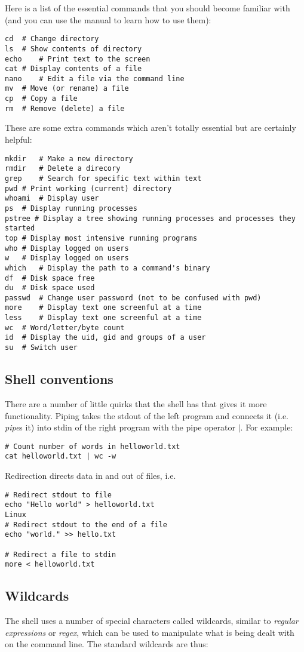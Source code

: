 \documentclass{article}
\begin{document}
Here is a list of the essential commands that you should become familiar with (and you can use the manual to learn how to use them): 
\begin{verbatim}
cd	# Change directory
ls	# Show contents of directory
echo	# Print text to the screen
cat	# Display contents of a file
nano	# Edit a file via the command line
mv	# Move (or rename) a file
cp	# Copy a file
rm	# Remove (delete) a file
\end{verbatim}
These are some extra commands which aren't totally essential but are certainly helpful:
\begin{verbatim}
mkdir	# Make a new directory
rmdir	# Delete a direcory
grep	# Search for specific text within text
pwd	# Print working (current) directory
whoami	# Display user
ps	# Display running processes
pstree # Display a tree showing running processes and processes they started
top # Display most intensive running programs
who	# Display logged on users
w	# Display logged on users
which	# Display the path to a command's binary
df	# Disk space free
du	# Disk space used
passwd	# Change user password (not to be confused with pwd)
more	# Display text one screenful at a time
less	# Display text one screenful at a time
wc	# Word/letter/byte count
id	# Display the uid, gid and groups of a user
su	# Switch user
\end{verbatim}

\subsection{Shell conventions}
There are a number of little quirks that the shell has that gives it more functionality.
Piping takes the stdout of the left program and connects it (i.e. \emph{pipe}s it) into stdin of the right program with the pipe operator $|$. For example:
\begin{verbatim}
# Count number of words in helloworld.txt
cat helloworld.txt | wc -w 
\end{verbatim}
Redirection directs data in and out of files, i.e. 
\begin{verbatim}
# Redirect stdout to file
echo "Hello world" > helloworld.txt
Linux
# Redirect stdout to the end of a file
echo "world." >> hello.txt

# Redirect a file to stdin
more < helloworld.txt
\end{verbatim}

\subsection{Wildcards}
The shell uses a number of special characters called wildcards, similar to \emph{regular expressions} or \emph{regex}, which can be used to manipulate what is being dealt with on the command line. The standard wildcards are thus:
\end{document}
